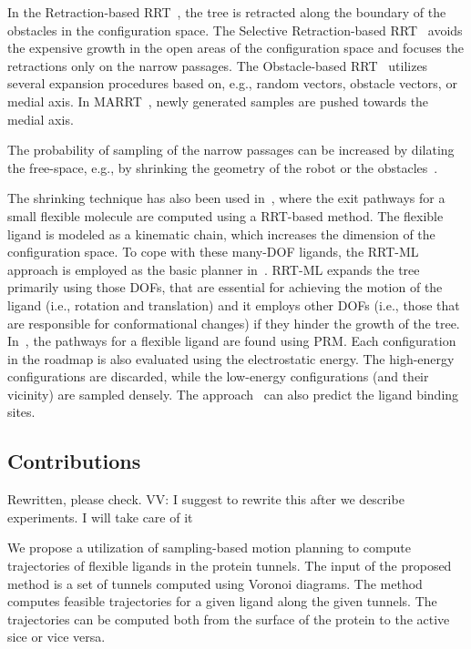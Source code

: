 \documentclass{bmcart}
\begin{document}
In the Retraction-based RRT~\cite{zhangRetraction}, the tree is retracted along the boundary of the obstacles in the configuration space.
The Selective Retraction-based RRT~\cite{lee2012srrrt} avoids the expensive growth in the open areas of the configuration space and focuses the retractions only on the narrow passages.
The Obstacle-based RRT~\cite{amatoOBRRT} utilizes several expansion procedures based on, e.g., random vectors, obstacle vectors, or medial axis.
In MARRT~\cite{denny2014marrt}, newly generated samples are pushed towards the medial axis.

The probability of sampling of the narrow passages can be increased by dilating the free-space, e.g., by shrinking the geometry of the robot or the obstacles~\cite{bayazitIRC}.

The shrinking technique has also been used in~\cite{cortes2010simulating}, where the exit pathways for a small flexible molecule are computed using a RRT-based method.
The flexible ligand is modeled as a kinematic chain, which increases the dimension of the configuration space.
To cope with these many-DOF ligands, the RRT-ML~\cite{cortes2007mlrrt} approach is employed as the basic planner in~\cite{cortes2010simulating}.
RRT-ML expands the tree primarily using those DOFs, that are essential for achieving the motion of the ligand (i.e., rotation
and translation) and it employs other DOFs (i.e., those that are responsible for conformational changes) if they hinder the growth of the tree.
In~\cite{singhLIG}, the pathways for a flexible ligand are found using PRM.
Each configuration in the roadmap is also evaluated using the electrostatic energy.
The high-energy configurations are discarded, while the low-energy configurations (and their vicinity) are sampled densely.
The approach~\cite{singhLIG} can also predict the ligand binding sites.





\subsection*{Contributions}
{\color{red}Rewritten, please check. VV: I suggest to rewrite this after we describe experiments. I will take care of it }

We propose a utilization of sampling-based motion planning to compute trajectories of flexible ligands in the protein tunnels.
The input of the proposed method is a set of tunnels computed using Voronoi diagrams.
The method computes feasible trajectories for a given ligand along the given tunnels. 
The trajectories can be computed both from the surface of the protein to the active sice or vice versa.
\end{document}
